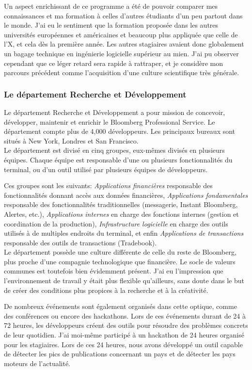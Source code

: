 \documentclass[11pt, oneside, titlepage, a4paper]{article}
\begin{document}
Un aspect enrichissant de ce programme a été de pouvoir comparer mes connaissances et ma formation à celles d'autres étudiants d'un peu partout dans le monde. J'ai eu le sentiment que la formation proposée dans les autres universités européennes et américaines et beaucoup plus \og appliquée \fg{} que celle de l'X, et cela dès la première année. Les autres stagiaires avaient donc globalement un bagage technique en ingénierie logicielle supérieur au mien. J'ai pu observer cependant que ce léger retard sera rapide à rattraper, et je considère mon parcours précédent comme l'acquisition d'une culture scientifique très générale.
		\subsubsection{Le département Recherche et Développement} \label{RD}
Le département Recherche et Développement a pour mission de concevoir, développer, maintenir et enrichir le Bloomberg Professional Service. Le département compte plus de 4,000 développeurs. Les principaux bureaux sont situés à New York, Londres et San Francisco.
\\

Le département est divisé en cinq groupes, eux-mêmes divisés en plusieurs équipes. Chaque équipe est responsable d'une ou plusieurs fonctionnalités du terminal, ou d'un outil utilisé par plusieurs équipes de développeurs.

Ces groupes sont les suivants: \textit{Applications financières} responsable des fonctionnalités donnant accès aux données financières, \textit{Applications fondamentales} responsable des fonctionnalités traditionnelles (messagerie, Instant Bloomberg, Alertes, etc.), \textit{Applications internes} en charge des fonctions internes (gestion et coordination de la production), \textit{Infrastructure logicielle} en charge des outils utilisés à de multiples endroits du terminal, et enfin \textit{Applications de transactions} responsable des outils de transactions (Tradebook).
\\

Le département possède une culture différente de celle du reste de Bloomberg, plus proche d'une compagnie technologique que financière. Le socle de valeurs communes est toutefois bien évidemment présent. J'ai eu l'impression que l'environnement de travail y était plus flexible qu'ailleurs, sans doute dans le but de créer des conditions plus propices à la recherche et à la créativité.

De nombreux événements sont également organisés dans cette optique, comme des conférences ou encore des hackathons. Lors de ces événements durant de 24 à 72 heures, les développeurs créent des outils pour résoudre des problèmes concrets de leur quotidien. J'ai moi-même participé à un hackathon de 24 heures organisé pour les stagiaires. Lors de ces 24 heures, nous avons développé un outil capable de détecter les pics de publications concernant un pays et de détecter les pays \og moteurs\fg{} de l'actualité.
\\
\end{document}
